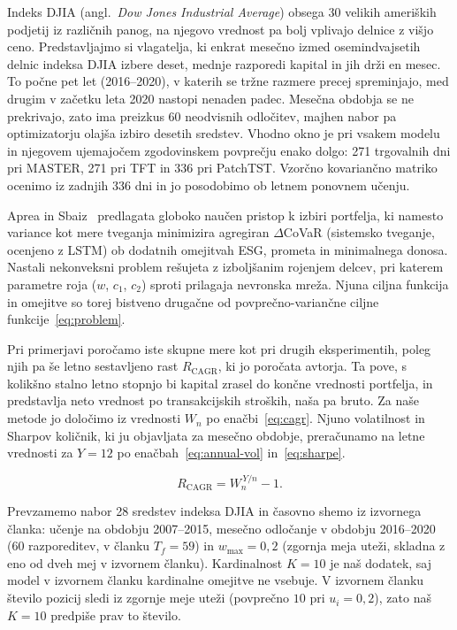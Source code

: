 \documentclass[9pt]{style/friteza}
\begin{document}
Indeks DJIA (angl.\ \emph{Dow Jones Industrial Average}) obsega 30 velikih ameriških podjetij iz različnih panog, na njegovo vrednost pa bolj vplivajo delnice z višjo ceno. Predstavljajmo si vlagatelja, ki enkrat mesečno izmed osemindvajsetih delnic indeksa DJIA izbere deset, mednje razporedi kapital in jih drži en mesec. To počne pet let (2016--2020), v katerih se tržne razmere precej spreminjajo, med drugim v začetku leta 2020 nastopi nenaden padec. Mesečna obdobja se ne prekrivajo, zato ima preizkus 60 neodvisnih odločitev, majhen nabor pa optimizatorju olajša izbiro desetih sredstev. Vhodno okno je pri vsakem modelu in njegovem ujemajočem zgodovinskem povprečju enako dolgo: 271 trgovalnih dni pri MASTER, 271 pri TFT in 336 pri PatchTST. Vzorčno kovariančno matriko ocenimo iz zadnjih 336 dni in jo posodobimo ob letnem ponovnem učenju. 

Aprea in Sbaiz~\cite{aprea2026} predlagata globoko naučen pristop k izbiri portfelja, ki namesto variance kot mere tveganja minimizira agregiran $\Delta$CoVaR (sistemsko tveganje, ocenjeno z LSTM) ob dodatnih omejitvah ESG, prometa in minimalnega donosa. Nastali nekonveksni problem rešujeta z izboljšanim rojenjem delcev, pri katerem parametre roja ($w$, $c_1$, $c_2$) sproti prilagaja nevronska mreža. Njuna ciljna funkcija in omejitve so torej bistveno drugačne od povprečno-variančne ciljne funkcije~\eqref{eq:problem}.

Pri primerjavi poročamo iste skupne mere kot pri drugih eksperimentih, poleg njih pa še letno sestavljeno rast $R_{\mathrm{CAGR}}$, ki jo poročata avtorja. Ta pove, s kolikšno stalno letno stopnjo bi kapital zrasel do končne vrednosti portfelja, in predstavlja neto vrednost po transakcijskih stroških, naša pa bruto. Za naše metode jo določimo iz vrednosti $W_n$ po enačbi~\eqref{eq:cagr}. Njuno volatilnost in Sharpov količnik, ki ju objavljata za mesečno obdobje, preračunamo na letne vrednosti za $Y=12$ po enačbah~\eqref{eq:annual-vol} in~\eqref{eq:sharpe}.

\begin{equation}
\label{eq:cagr}
R_{\mathrm{CAGR}}=W_n^{\,Y/n}-1.
\end{equation}

Prevzamemo nabor 28 sredstev indeksa DJIA in časovno shemo iz izvornega članka: učenje na obdobju 2007--2015, mesečno odločanje v obdobju 2016--2020 (60 razporeditev, v članku $T_f=59$) in $w_{\max}=0{,}2$ (zgornja meja uteži, skladna z eno od dveh mej v izvornem članku). Kardinalnost $K=10$ je naš dodatek, saj model v izvornem članku kardinalne omejitve ne vsebuje. V izvornem članku število pozicij sledi iz zgornje meje uteži (povprečno $10$ pri $u_i=0{,}2$), zato naš $K=10$ predpiše prav to število.
\end{document}
